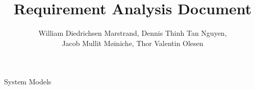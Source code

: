 \documentclass[]{article}
\title{Requirement Analysis Document}
\author{William Diedrichsen Marstrand, Dennis Thinh Tan Nguyen, \\Jacob Mullit Møiniche, Thor Valentin Olesen}
\begin{document}
\maketitle





\begin{section}{System Models}







\end{section}
\end{document}
